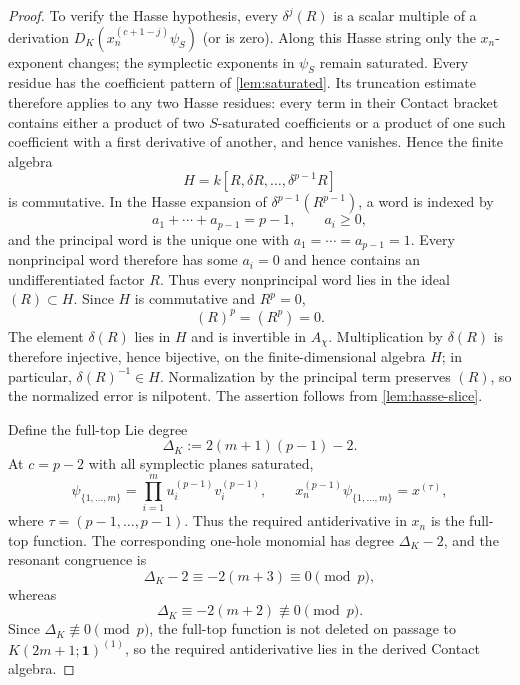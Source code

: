 \documentclass[11pt,reqno]{amsart}
\theoremstyle{definition}
\theoremstyle{remark}
\theoremstyle{definition}
\newcommand{\Achi}{A_{\chi}}
\begin{document}
\begin{proof}
To verify the Hasse hypothesis, every
$\delta^j(R)$ is a scalar multiple of a derivation
$D_K(x_n^{(c+1-j)}\psi_S)$ (or is zero).  Along this Hasse string only the
$x_n$-exponent changes; the symplectic exponents in $\psi_S$ remain saturated.
Every residue has the coefficient pattern of \cref{lem:saturated}.  Its truncation estimate therefore applies to any two
Hasse residues: every term in their Contact bracket contains either a product
of two $S$-saturated coefficients or a product of one such coefficient with a
first derivative of another, and hence vanishes.  Hence the finite algebra
\[
 H=k[R,\delta R,\ldots,\delta^{p-1}R]
\]
is commutative.  In the Hasse expansion of
$\delta^{p-1}(R^{p-1})$, a word is indexed by
\[
 a_1+\cdots+a_{p-1}=p-1,
 \qquad a_i\ge0,
\]
and the principal word is the unique one with
$a_1=\cdots=a_{p-1}=1$.  Every nonprincipal word therefore has some
$a_i=0$ and hence contains an undifferentiated factor $R$.  Thus every
nonprincipal word lies in the ideal $(R)\subset H$.  Since $H$ is
commutative and $R^p=0$,
\[
 (R)^p=(R^p)=0.
\]
The element $\delta(R)$ lies in $H$ and is invertible in $\Achi$.
Multiplication by $\delta(R)$ is therefore injective, hence bijective, on the
finite-dimensional algebra $H$; in particular, $\delta(R)^{-1}\in H$.
Normalization by the principal term preserves $(R)$, so the normalized error
is nilpotent.  The assertion follows from \cref{lem:hasse-slice}.

Define the full-top Lie degree
\[
 \Delta_K:=2(m+1)(p-1)-2.
\]
At $c=p-2$ with all symplectic planes saturated,
\[
 \psi_{\{1,\ldots,m\}}
 =\prod_{i=1}^m u_i^{(p-1)}v_i^{(p-1)},
 \qquad
 x_n^{(p-1)}\psi_{\{1,\ldots,m\}}=x^{(\tau)},
\]
where $\tau=(p-1,\ldots,p-1)$.  Thus the required antiderivative in $x_n$ is
the full-top function.  The corresponding one-hole monomial has degree
$\Delta_K-2$, and the resonant congruence is
\[
 \Delta_K-2\equiv-2(m+3)\equiv0\pmod p,
\]
whereas
\[
 \Delta_K\equiv-2(m+2)\not\equiv0\pmod p.
\]
Since $\Delta_K\not\equiv0\pmod p$, the full-top function is not deleted on
passage to $K(2m+1;\mathbf1)^{(1)}$, so the required antiderivative lies in
the derived Contact algebra.


\end{proof}
\end{document}
